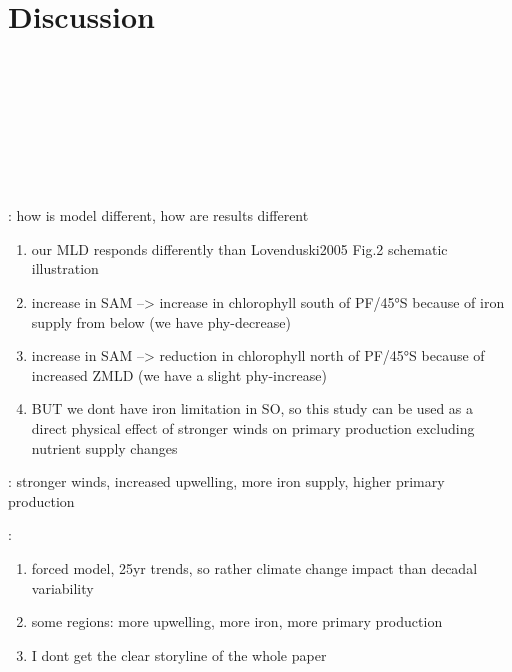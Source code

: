 \chapter{Discussion}\label{ch:discussion} %

\citep{landschuetzer2015} \\
\citep{LeQuere2007}\\
\citep{Lovenduski2005}\\ 
\citep{Lovenduski2007}\\
\citep{Lovenduski2008}\\
\citep{Hauck2013}\\
\citep{wang2012}\\
\vspace{3cm}

\citep{Lovenduski2005}: how is model different, how are results different
\begin{enumerate}
\item our MLD responds differently than Lovenduski2005 Fig.2 schematic illustration
\item increase in SAM --> increase in chlorophyll south of PF/45°S because of iron supply from below (we have phy-decrease)
\item increase in SAM --> reduction in chlorophyll north of PF/45°S because of increased ZMLD (we have a slight phy-increase)
\item BUT we dont have iron limitation in SO, so this study can be used as a direct physical effect of stronger winds on primary production excluding nutrient supply changes
\end{enumerate} 

\citep{Hauck2013}: stronger winds, increased upwelling, more iron supply, higher primary production

\citep{wang2012}: 
\begin{enumerate}
\item forced model, 25yr trends, so rather climate change impact than decadal variability
\item some regions: more upwelling, more iron, more primary production 
\item I dont get the clear storyline of the whole paper
\end{enumerate}

